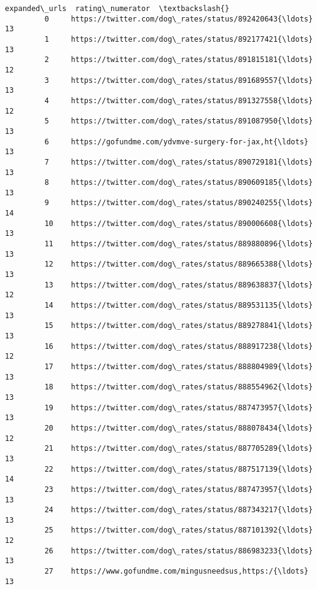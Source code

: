 \documentclass[11pt]{article}
\begin{document}
\begin{Verbatim}[commandchars=\\\{\}]
                                                   expanded\_urls  rating\_numerator  \textbackslash{}
         0     https://twitter.com/dog\_rates/status/892420643{\ldots}                13   
         1     https://twitter.com/dog\_rates/status/892177421{\ldots}                13   
         2     https://twitter.com/dog\_rates/status/891815181{\ldots}                12   
         3     https://twitter.com/dog\_rates/status/891689557{\ldots}                13   
         4     https://twitter.com/dog\_rates/status/891327558{\ldots}                12   
         5     https://twitter.com/dog\_rates/status/891087950{\ldots}                13   
         6     https://gofundme.com/ydvmve-surgery-for-jax,ht{\ldots}                13   
         7     https://twitter.com/dog\_rates/status/890729181{\ldots}                13   
         8     https://twitter.com/dog\_rates/status/890609185{\ldots}                13   
         9     https://twitter.com/dog\_rates/status/890240255{\ldots}                14   
         10    https://twitter.com/dog\_rates/status/890006608{\ldots}                13   
         11    https://twitter.com/dog\_rates/status/889880896{\ldots}                13   
         12    https://twitter.com/dog\_rates/status/889665388{\ldots}                13   
         13    https://twitter.com/dog\_rates/status/889638837{\ldots}                12   
         14    https://twitter.com/dog\_rates/status/889531135{\ldots}                13   
         15    https://twitter.com/dog\_rates/status/889278841{\ldots}                13   
         16    https://twitter.com/dog\_rates/status/888917238{\ldots}                12   
         17    https://twitter.com/dog\_rates/status/888804989{\ldots}                13   
         18    https://twitter.com/dog\_rates/status/888554962{\ldots}                13   
         19    https://twitter.com/dog\_rates/status/887473957{\ldots}                13   
         20    https://twitter.com/dog\_rates/status/888078434{\ldots}                12   
         21    https://twitter.com/dog\_rates/status/887705289{\ldots}                13   
         22    https://twitter.com/dog\_rates/status/887517139{\ldots}                14   
         23    https://twitter.com/dog\_rates/status/887473957{\ldots}                13   
         24    https://twitter.com/dog\_rates/status/887343217{\ldots}                13   
         25    https://twitter.com/dog\_rates/status/887101392{\ldots}                12   
         26    https://twitter.com/dog\_rates/status/886983233{\ldots}                13   
         27    https://www.gofundme.com/mingusneedsus,https:/{\ldots}                13   

\end{Verbatim}
\end{document}

